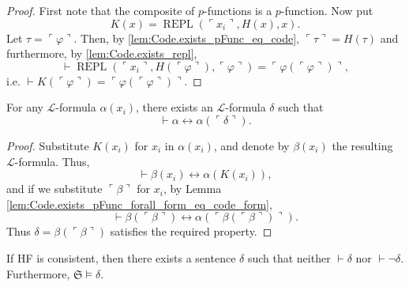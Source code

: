 \begin{proof}
    First note that the composite of $p$-functions is a $p$-function.
    Now put
    $$
    K(x) = \operatorname{REPL}(\ulcorner{x_i}\urcorner, H(x), x).
    $$
    Let $\tau = \ulcorner{\varphi}\urcorner$.
    Then, by \ref{lem:Code.exists_pFunc_eq_code}, $\ulcorner{\tau}\urcorner = H (\tau)$ and
    furthermore, by \ref{lem:Code.exists_repl},
    $$
    \vdash \operatorname{REPL}(\ulcorner{x_i}\urcorner, H(\ulcorner{\varphi}\urcorner), 
    \ulcorner{\varphi}\urcorner) = \ulcorner{\varphi(\ulcorner {\varphi} \urcorner)}\urcorner,
    $$
    i.e. $\vdash K (\ulcorner{\varphi}\urcorner)=
    \ulcorner{\varphi(\ulcorner {\varphi} \urcorner)}\urcorner$.
\end{proof}

\begin{theorem}
    \label{thm:diagonal}
    \leanok
    For any $\mathcal{L}$-formula $\alpha(x_i)$, there exists an $\mathcal{L}$-formula 
    $\delta$ such that 
    $$
    \vdash \alpha \leftrightarrow \alpha(\ulcorner{\delta}\urcorner).
    $$
\end{theorem}

\begin{proof}
    Substitute $K(x_i)$ for $x_i$ in $\alpha(x_i)$, 
    and denote by $\beta(x_i)$ the resulting $\mathcal{L}$-formula.
    Thus,
    $$
    \vdash \beta(x_i) \leftrightarrow \alpha(K(x_i)),
    $$
    and if we substitute $\ulcorner{\beta}\urcorner$ for $x_i$, 
    by Lemma \ref{lem:Code.exists_pFunc_forall_form_eq_code_form},
    $$
    \vdash \beta(\ulcorner{\beta}\urcorner) \leftrightarrow 
    \alpha(\ulcorner{\beta(\ulcorner{\beta}\urcorner)}\urcorner).
    $$
    Thus $\delta = \beta(\ulcorner{\beta}\urcorner)$ satisfies the required property.
\end{proof}

\begin{theorem}
    \label{thm:first_incompleteness}
    \leanok
    If HF is consistent, then there exists a sentence $\delta$ such that
    neither $\vdash \delta$ nor $\vdash \neg \delta$. 
    Furthermore, $\mathfrak{S} \vDash \delta$.
\end{theorem}

